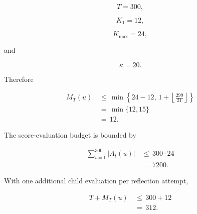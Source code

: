 \documentclass{article} %
\begin{document}
\begin{equation}
\label{eq:app-third-rollout-example-t}
T
=
300,
\end{equation}

\begin{equation}
\label{eq:app-third-rollout-example-k1}
K_1
=
12,
\end{equation}

\begin{equation}
\label{eq:app-third-rollout-example-kmax}
K_{\max}
=
24,
\end{equation}

and

\begin{equation}
\label{eq:app-third-rollout-example-kappa}
\kappa
=
20.
\end{equation}

Therefore

\begin{align}
\label{eq:app-third-rollout-example-m}
M_T(u)
&\,\le\,
\min\!\left\{
24-12,\,
1+\left\lfloor\frac{299}{21}\right\rfloor
\right\}
\\
&\,=\,
\min\{12,15\}
\\
&\,=\,
12.
\end{align}

The score-evaluation budget is bounded by

\begin{align}
\label{eq:app-third-rollout-example-score}
\sum_{t=1}^{300}|A_t(u)|
&\,\le\,
300\cdot 24
\\
&\,=\,
7200.
\end{align}

With one additional child evaluation per reflection attempt,

\begin{align}
\label{eq:app-third-rollout-example-rollouts}
T+M_T(u)
&\,\le\,
300+12
\\
&\,=\,
312.
\end{align}
\end{document}
